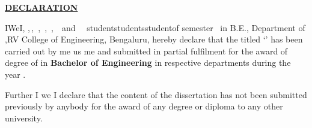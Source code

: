 
\thispagestyle{empty}
\vspace{-0.75cm}
\begin{center}
	\Large\textbf{\underline{DECLARATION}} \par
\end{center}


\noindent \ifPG I\else \ifStuNameBUsed We\else I\fi\fi, \textbf{\printStuNameA}\ifPG ,$\,$\else\ifStuNameBUsed\ifStuNameCUsed,$\,$ \fi \textbf{\printStuNameB}\ifStuNameCUsed \ifStuNameDUsed,$\,$ \fi \textbf{\printStuNameC}\ifStuNameDUsed\ifIDP,$\,$ \fi  \textbf{\printStuNameD}\ifIDP\ifStuNameEUsed\ifStuNameFUsed,$\,$ \fi \textbf{\printStuNameE}$\,$ \ifStuNameFUsed and $\,$ \textbf{\printStuNameF}$\,$ \fi\fi\fi\fi\fi\fi\fi \ifPG student\space \else \ifStuNameBUsed\space students\space\else\space student\space\fi\fi of \ifPG {} \fi\else{}\else{}\else {}\fi\fi\fi\fi\space semester \ifPG \printMastersInSF\, in \printMastersPrgName \else B.E.\fi, \ifIDP \else Department of \printDepartmentLF,\fi\space RV College of Engineering, Bengaluru, hereby declare that the  \else {} \else {}\fi\fi\fi titled `\textbf{\printTitle}' has been carried out by \ifPG me \else \ifStuNameBUsed us \else me \fi\fi and submitted in partial fulfilment for the award of degree of \ifPG \textbf{\printMastersInLF} in \textbf{\printMastersPrgName} \else\textbf{Bachelor of Engineering} in \ifIDP respective departments \else  \textbf{\printDepartmentLF} \fi\fi during the year \printAcadYear.\\ \par

\noindent Further \ifPG I \else\ifStuNameBUsed we \else I \fi \fi declare that the content of the dissertation has not been submitted previously by anybody for the award of any degree or diploma to any other university.\\ \par

